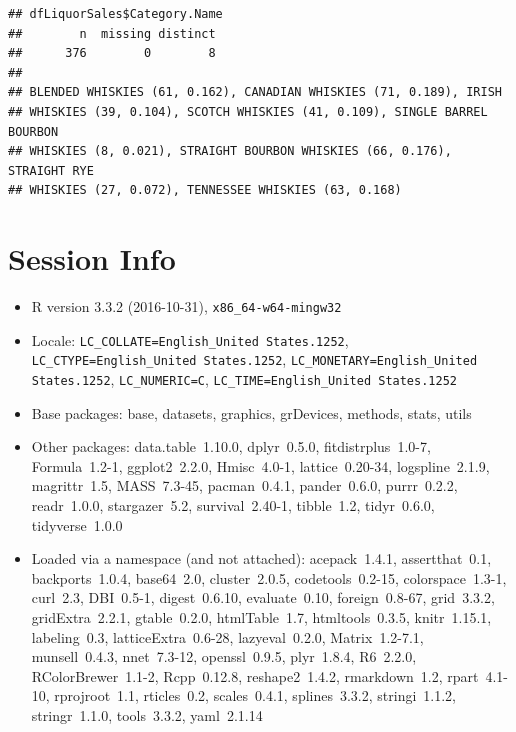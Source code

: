 \documentclass[]{elsarticle} %
\newenvironment{Shaded}{\begin{snugshade}}{\end{snugshade}}
\newcommand{\KeywordTok}[1]{\textcolor[rgb]{0.13,0.29,0.53}{\textbf{{#1}}}}
\newcommand{\NormalTok}[1]{{#1}}
\begin{document}
\begin{Shaded}
\end{Shaded}

\begin{verbatim}
## dfLiquorSales$Category.Name 
##        n  missing distinct 
##      376        0        8 
## 
## BLENDED WHISKIES (61, 0.162), CANADIAN WHISKIES (71, 0.189), IRISH
## WHISKIES (39, 0.104), SCOTCH WHISKIES (41, 0.109), SINGLE BARREL BOURBON
## WHISKIES (8, 0.021), STRAIGHT BOURBON WHISKIES (66, 0.176), STRAIGHT RYE
## WHISKIES (27, 0.072), TENNESSEE WHISKIES (63, 0.168)
\end{verbatim}

\section{Session Info}\label{session-info}

\begin{itemize}\raggedright
  \item R version 3.3.2 (2016-10-31), \verb|x86_64-w64-mingw32|
  \item Locale: \verb|LC_COLLATE=English_United States.1252|, \verb|LC_CTYPE=English_United States.1252|, \verb|LC_MONETARY=English_United States.1252|, \verb|LC_NUMERIC=C|, \verb|LC_TIME=English_United States.1252|
  \item Base packages: base, datasets, graphics, grDevices,
    methods, stats, utils
  \item Other packages: data.table~1.10.0, dplyr~0.5.0,
    fitdistrplus~1.0-7, Formula~1.2-1, ggplot2~2.2.0, Hmisc~4.0-1,
    lattice~0.20-34, logspline~2.1.9, magrittr~1.5, MASS~7.3-45,
    pacman~0.4.1, pander~0.6.0, purrr~0.2.2, readr~1.0.0,
    stargazer~5.2, survival~2.40-1, tibble~1.2, tidyr~0.6.0,
    tidyverse~1.0.0
  \item Loaded via a namespace (and not attached): acepack~1.4.1,
    assertthat~0.1, backports~1.0.4, base64~2.0, cluster~2.0.5,
    codetools~0.2-15, colorspace~1.3-1, curl~2.3, DBI~0.5-1,
    digest~0.6.10, evaluate~0.10, foreign~0.8-67, grid~3.3.2,
    gridExtra~2.2.1, gtable~0.2.0, htmlTable~1.7, htmltools~0.3.5,
    knitr~1.15.1, labeling~0.3, latticeExtra~0.6-28,
    lazyeval~0.2.0, Matrix~1.2-7.1, munsell~0.4.3, nnet~7.3-12,
    openssl~0.9.5, plyr~1.8.4, R6~2.2.0, RColorBrewer~1.1-2,
    Rcpp~0.12.8, reshape2~1.4.2, rmarkdown~1.2, rpart~4.1-10,
    rprojroot~1.1, rticles~0.2, scales~0.4.1, splines~3.3.2,
    stringi~1.1.2, stringr~1.1.0, tools~3.3.2, yaml~2.1.14
\end{itemize}
\end{document}
